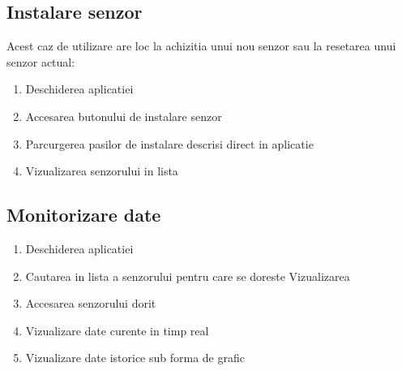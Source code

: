 \subsection{Instalare senzor}\label{subsec:cdu_instalare}
Acest caz de utilizare are loc la achizitia unui nou senzor sau la resetarea unui senzor actual:
\begin{enumerate}
    \item Deschiderea aplicatiei
    \item Accesarea butonului de instalare senzor
    \item Parcurgerea pasilor de instalare descrisi direct in aplicatie
    \item Vizualizarea senzorului in lista
\end{enumerate}
\subsection{Monitorizare date}\label{subsec:cdu_monitorizare}
\begin{enumerate}
    \item Deschiderea aplicatiei
    \item Cautarea in lista a senzorului pentru care se doreste Vizualizarea
    \item Accesarea senzorului dorit
    \item Vizualizare date curente in timp real
    \item Vizualizare date istorice sub forma de grafic
\end{enumerate}